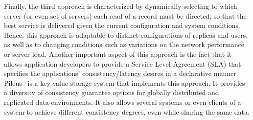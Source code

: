 Finally, the third approach is characterized by dynamically selecting to which server (or even set of servers) each read of a record must be directed, so that the best service is delivered given the current configuration and system conditions. Hence, this approach is adaptable to distinct configurations of replicas and users, as well as to changing conditions such as variations on the network performance or server load. Another important aspect of this approach is the fact that it allows application developers to provide a Service Level Agreement (SLA) that specifies the applications' consistency/latency desires in a declarative manner. Pileus~\cite{Terry:2013} is a key-value storage system that implements this approach. It provides a diversity of consistency guarantee options for globally distributed and replicated data environments. It also allows several systems or even clients of a system to achieve different consistency degrees, even while sharing the same data.

